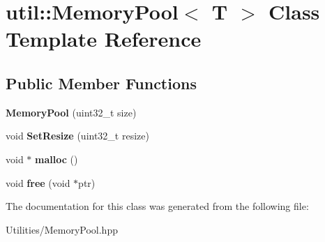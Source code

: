 \hypertarget{classutil_1_1_memory_pool}{\section{util\+:\+:Memory\+Pool$<$ T $>$ Class Template Reference}
\label{classutil_1_1_memory_pool}
}
\subsection*{Public Member Functions}
\begin{DoxyCompactItemize}
\item 
\hypertarget{classutil_1_1_memory_pool_acc126610891d22d75a51ab7c465f79b1}{{\bfseries Memory\+Pool} (uint32\+\_\+t size)}\label{classutil_1_1_memory_pool_acc126610891d22d75a51ab7c465f79b1}

\item 
\hypertarget{classutil_1_1_memory_pool_ad4fa4dd17b073dcc107425e816f037cf}{void {\bfseries Set\+Resize} (uint32\+\_\+t resize)}\label{classutil_1_1_memory_pool_ad4fa4dd17b073dcc107425e816f037cf}

\item 
\hypertarget{classutil_1_1_memory_pool_a4f21ebd575d3939e1c553a4acc3b1563}{void $\ast$ {\bfseries malloc} ()}\label{classutil_1_1_memory_pool_a4f21ebd575d3939e1c553a4acc3b1563}

\item 
\hypertarget{classutil_1_1_memory_pool_aa1572f0ccedc42c13d24676773985841}{void {\bfseries free} (void $\ast$ptr)}\label{classutil_1_1_memory_pool_aa1572f0ccedc42c13d24676773985841}

\end{DoxyCompactItemize}


The documentation for this class was generated from the following file\+:\begin{DoxyCompactItemize}
\item 
Utilities/Memory\+Pool.\+hpp\end{DoxyCompactItemize}
